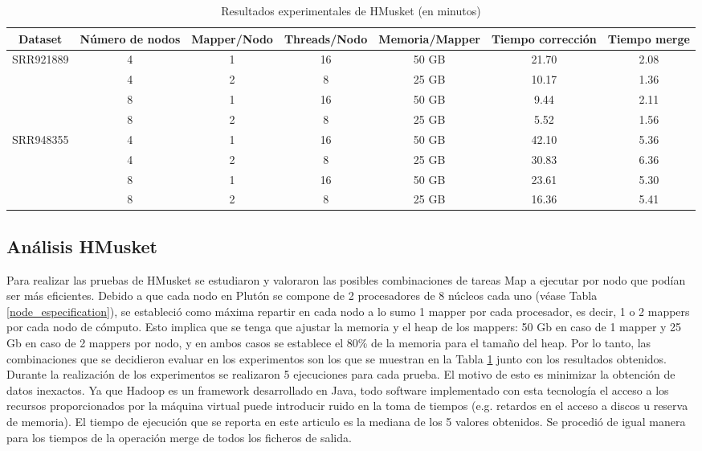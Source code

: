 \documentclass[conference]{IEEEtran}
\begin{document}
\begin{table}[]
	\begin{tabular}{|c|c|c|c|c|c|c|}
		\hline
		\textbf{Dataset} &	\textbf{Número de nodos} & \textbf{Mapper/Nodo} & \textbf{Threads/Nodo} & \textbf{Memoria/Mapper} & \textbf{Tiempo corrección} & \textbf{Tiempo merge}	\\ \hline
		\multirow{ 4}{*}{SRR921889} &	4 & 1 & 16 & 50 GB & 21.70	& 2.08	\\ \cline{2-7}
									&	4 & 2 & 8 & 25 GB  & 10.17	& 1.36	\\ \cline{2-7}
									&	8 & 1 & 16 & 50 GB & 9.44	& 2.11	\\ \cline{2-7}
									&	8 & 2 & 8 & 25 GB  & 5.52	& 1.56	\\ \hline \hline
									
		\multirow{ 4}{*}{SRR948355} &	4 & 1 & 16 & 50 GB & 42.10	& 5.36	\\ \cline{2-7}
									&	4 & 2 & 8 & 25 GB  & 30.83	& 6.36	\\ \cline{2-7}
									&	8 & 1 & 16 & 50 GB & 23.61	& 5.30	\\ \cline{2-7}
									&	8 & 2 & 8 & 25 GB  & 16.36	& 5.41 \\ \hline
	\end{tabular}
	\caption{Resultados experimentales de HMusket (en minutos)}
	\label{hmusket_experiment_result}
\end{table}

\subsection{Análisis HMusket}
Para realizar las pruebas de HMusket se estudiaron y valoraron las posibles combinaciones de tareas Map a ejecutar por nodo que podían ser más eficientes. Debido a que cada nodo en Plutón se compone de 2 procesadores de 8 núcleos cada uno (véase Tabla \ref{node_especification}), se estableció como máxima repartir en cada nodo a lo sumo 1 mapper por cada procesador, es decir, 1 o 2 mappers por cada nodo de cómputo. Esto implica que se tenga que ajustar la memoria y el heap de los mappers: 50 Gb en caso de 1 mapper y 25 Gb en caso de 2 mappers por nodo, y en ambos casos se establece el 80\% de la memoria para el tamaño del heap. Por lo tanto, las combinaciones que se decidieron evaluar en los experimentos son los que se muestran en la Tabla \ref{hmusket_experiment_result} junto con los resultados obtenidos.\\

Durante la realización de los experimentos se realizaron 5 ejecuciones para cada prueba. El motivo de esto es minimizar la obtención de datos inexactos. Ya que Hadoop es un framework desarrollado en Java, todo software implementado con esta tecnología el acceso a los recursos proporcionados por la máquina virtual puede introducir ruido en la toma de tiempos (e.g. retardos en el acceso a discos u reserva de memoria). El tiempo de ejecución que se reporta en este articulo es la mediana de los 5 valores obtenidos. Se procedió de igual manera para los tiempos de la operación merge de todos los ficheros de salida.\\
\end{document}
